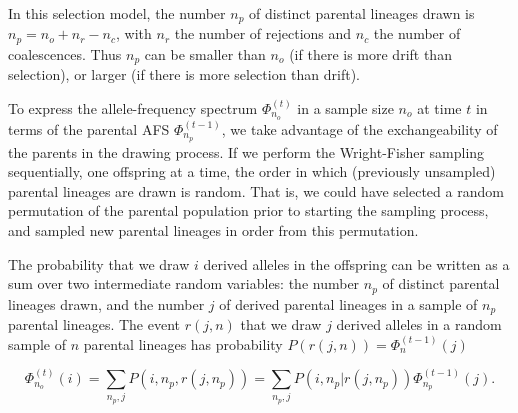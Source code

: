 \documentclass[review]{elsarticle}
\newcommand{\afs}[2]{\Phi_{#1}^{(#2)}}
\begin{document}

In this selection model, the number $n_p$ of distinct parental lineages drawn is $n_p = n_o+n_r-n_c$, with $n_r$ 
the number of rejections and $n_c$ the number of coalescences. 
Thus $n_p$ can be smaller than $n_o$ (if there is more drift than selection), or larger 
(if there is more selection than drift). 




To express the allele-frequency spectrum $\afs{n_o}{t}$ in a sample size $n_o$ at time $t$ in terms of the parental AFS $\afs{n_p}{t-1}$, we take advantage of the exchangeability of the parents in the drawing process. If we perform the Wright-Fisher sampling sequentially, one offspring at a time, the order in which (previously unsampled) parental lineages are drawn is random. 
That is, we could have selected a random permutation of the parental population prior to starting the sampling process,
and sampled new parental lineages in order from this permutation. 

The probability that we draw $i$ derived alleles in the offspring can be written as a sum over two intermediate random variables: 
the number $n_p$ of  distinct parental lineages drawn, and the number $j$ of derived parental lineages in a sample of $n_p$ 
parental lineages. The event $r(j,n)$ that we draw $j$ derived alleles in a random sample of $n$ parental 
lineages has probability $P(r(j,n)) =\afs{n}{t-1}(j) $


$$\afs{n_o}{t}(i) = \sum_{n_p,j} P(i,n_p,r(j,n_p)) =\sum_{n_p,j}  P(i,n_p | r(j,n_p)) \afs{n_p}{t-1}(j).$$
 
\end{document}
